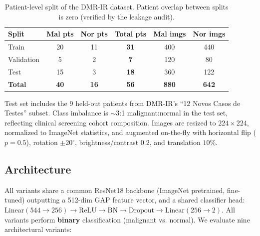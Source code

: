 \documentclass[conference]{IEEEtran}
\begin{document}
\begin{table}[h]
\centering
\caption{Patient-level split of the DMR-IR dataset. Patient overlap between splits is zero (verified by the leakage audit).}
\label{tab:split}
\begin{tabular}{lccccc}
\toprule
\textbf{Split} & \textbf{Mal pts} & \textbf{Nor pts} & \textbf{Total pts} & \textbf{Mal imgs} & \textbf{Nor imgs} \\
\midrule
Train      & 20 & 11 & \textbf{31} & 400 & 440 \\
Validation &  5 &  2 & \textbf{7}  & 120 &  80 \\
Test       & 15 &  3 & \textbf{18} & 360 & 122 \\
\midrule
\textbf{Total} & \textbf{40} & \textbf{16} & \textbf{56} & \textbf{880} & \textbf{642} \\
\bottomrule
\end{tabular}
\end{table}

Test set includes the 9 held-out patients from DMR-IR's ``12 Novos Casos de Testes'' subset. Class imbalance is $\sim$3:1 malignant:normal in the test set, reflecting clinical screening cohort composition. Images are resized to $224 \times 224$, normalized to ImageNet statistics, and augmented on-the-fly with horizontal flip ($p = 0.5$), rotation $\pm 20^\circ$, brightness/contrast $0.2$, and translation $10\%$.

\subsection{Architecture}
All variants share a common ResNet18 backbone (ImageNet pretrained, fine-tuned) outputting a 512-dim GAP feature vector, and a shared classifier head: $\text{Linear}(544 \to 256) \to \text{ReLU} \to \text{BN} \to \text{Dropout} \to \text{Linear}(256 \to 2)$. All variants perform \textbf{binary} classification (malignant vs. normal). We evaluate nine architectural variants:
\end{document}
